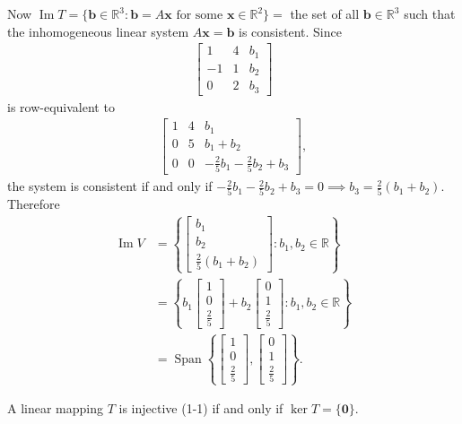 \documentclass[12pt,letterpaper,reqno]{article}
\numberwithin{equation}{section}
\newcommand{\R}{\ensuremath{\mathbb R}}
\DeclareMathOperator{\im}{Im}
\DeclareMathOperator{\Span}{Span}
\begin{document}
\begin{example}
Now $\im T=\{\mathbf{b}\in \R^3:\mathbf{b}=A\mathbf{x} \text{ for some } \mathbf{x} \in \R^2\}=$ the set of all $\mathbf{b} \in \R^3$ such that the inhomogeneous linear system $A\mathbf{x}=\mathbf{b}$ is consistent. Since
\begin{align*}
	\begin{bmatrix}
		1 & 4 & b_1 \\
		-1 & 1 & b_2 \\
		0 & 2 & b_3
	\end{bmatrix}
\end{align*}
is row-equivalent to 
\begin{align*}
	\begin{bmatrix}
		1 & 4 & b_1 \\
		0 & 5 & b_1+b_2 \\
		0 & 0 & -\frac{2}{5}b_1-\frac{2}{5}b_2+b_3
	\end{bmatrix},
\end{align*}
the system is consistent if and only if $-\frac{2}{5}b_1-\frac{2}{5}b_2+b_3=0 \implies b_3=\frac{2}{5}(b_1+b_2)$. Therefore
\begin{align*}
	\im V&=\left\{\begin{bmatrix}
		b_1 \\ b_2 \\ \frac{2}{5}(b_1+b_2)
 	\end{bmatrix}:b_1,b_2 \in \R\right\} \\
 	&=\left\{b_1\begin{bmatrix}
		1 \\ 0 \\ \frac{2}{5}
 	\end{bmatrix}+b_2\begin{bmatrix}
		0 \\ 1 \\ \frac{2}{5}
 	\end{bmatrix}:b_1,b_2 \in \R\right\} \\
 	&=\Span\left\{\begin{bmatrix}
		1 \\ 0 \\ \frac{2}{5}
 	\end{bmatrix}, \begin{bmatrix}
		0 \\ 1 \\ \frac{2}{5}
 	\end{bmatrix}\right\}.
\end{align*}
\end{example}

\begin{thm}\label{thm:kernel_of_an_injective_linear_map}
	A linear mapping $T$ is injective (1-1) if and only if $\ker T=\{\mathbf{0}\}$.
\end{thm}
\end{document}
